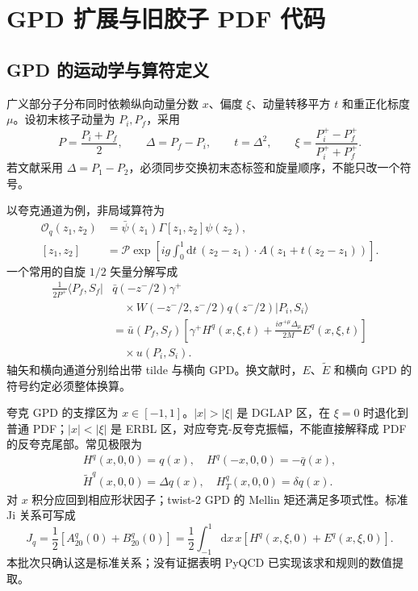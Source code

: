 \chapter{GPD 扩展与旧胶子 PDF 代码}
\section{GPD 的运动学与算符定义}

广义部分子分布同时依赖纵向动量分数 $x$、偏度 $\xi$、动量转移平方 $t$ 和重正化标度 $\mu$。设初末核子动量为 $P_i,P_f$，采用
\begin{equation}
  P=\frac{P_i+P_f}{2},
  \qquad
  \Delta=P_f-P_i,
  \qquad
  t=\Delta^2,
  \qquad
  \xi=\frac{P_i^+-P_f^+}{P_i^++P_f^+}.
  \label{eq:b07-gpdkin}
\end{equation}
若文献采用 $\Delta=P_1-P_2$，必须同步交换初末态标签和旋量顺序，不能只改一个符号。

以夸克通道为例，非局域算符为
\begin{align}
  \mathcal O_q(z_1,z_2)
  &=\bar\psi(z_1)\Gamma[z_1,z_2]\psi(z_2),\nonumber\\
  [z_1,z_2]&=\mathcal P\exp\!\left[
  ig\int_0^1\mathrm dt\,(z_2-z_1)\cdot A(z_1+t(z_2-z_1))
  \right].
  \label{eq:b07-gpdop}
\end{align}
一个常用的自旋 $1/2$ 矢量分解写成
\begin{align}
  \frac{1}{2P^+}\langle P_f,S_f|
  &\bar q(-z^-/2)\gamma^+\nonumber\\
  &\quad\times W(-z^-/2,z^-/2)q(z^-/2)|P_i,S_i\rangle\nonumber\\
  &=\bar u(P_f,S_f)\left[
  \gamma^+H^q(x,\xi,t)
  +\frac{i\sigma^{+\mu}\Delta_\mu}{2M}E^q(x,\xi,t)\right]\nonumber\\
  &\quad\times u(P_i,S_i).
  \label{eq:b07-gpddecomp}
\end{align}
轴矢和横向通道分别给出带 tilde 与横向 GPD。换文献时，$E$、$\widetilde E$ 和横向 GPD 的符号约定必须整体换算。

夸克 GPD 的支撑区为 $x\in[-1,1]$。$|x|>|\xi|$ 是 DGLAP 区，在 $\xi=0$ 时退化到普通 PDF；$|x|<|\xi|$ 是 ERBL 区，对应夸克-反夸克振幅，不能直接解释成 PDF 的反夸克尾部。常见极限为
\begin{equation}
  \begin{aligned}
  H^q(x,0,0)=q(x),\quad
  H^q(-x,0,0)=-\bar q(x),\\
  \widetilde H^q(x,0,0)=\Delta q(x),\quad
  H_T^q(x,0,0)=\delta q(x).
  \end{aligned}
  \label{eq:b07-gpdlimits}
\end{equation}
对 $x$ 积分应回到相应形状因子；twist-2 GPD 的 Mellin 矩还满足多项式性。标准 Ji 关系可写成
\begin{equation}
  J_q=\frac12\left[A^q_{20}(0)+B^q_{20}(0)\right]
  =\frac12\int_{-1}^{1}\mathrm dx\,x
  \left[H^q(x,\xi,0)+E^q(x,\xi,0)\right].
  \label{eq:b07-ji}
\end{equation}
本批次只确认这是标准关系；没有证据表明 PyQCD 已实现该求和规则的数值提取。

